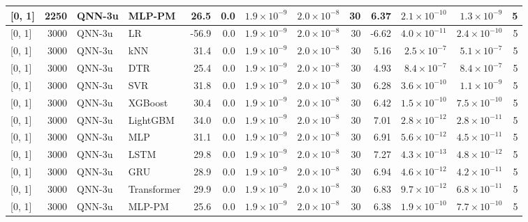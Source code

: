\begin{longtable}{lrllrrrrrrrrr}
{[0, 1]} & 2250 & QNN-3u & MLP-PM & 26.5 & 0.0 & $1.9 \times 10^{-9}$ & $2.0 \times 10^{-8}$ & 30 & 6.37 & $2.1 \times 10^{-10}$ & $1.3 \times 10^{-9}$ & 5 \\
\midrule
{[0, 1]} & 3000 & QNN-3u & LR & -56.9 & 0.0 & $1.9 \times 10^{-9}$ & $2.0 \times 10^{-8}$ & 30 & -6.62 & $4.0 \times 10^{-11}$ & $2.4 \times 10^{-10}$ & 5 \\
{[0, 1]} & 3000 & QNN-3u & kNN & 31.4 & 0.0 & $1.9 \times 10^{-9}$ & $2.0 \times 10^{-8}$ & 30 & 5.16 & $2.5 \times 10^{-7}$ & $5.1 \times 10^{-7}$ & 5 \\
{[0, 1]} & 3000 & QNN-3u & DTR & 25.4 & 0.0 & $1.9 \times 10^{-9}$ & $2.0 \times 10^{-8}$ & 30 & 4.93 & $8.4 \times 10^{-7}$ & $8.4 \times 10^{-7}$ & 5 \\
{[0, 1]} & 3000 & QNN-3u & SVR & 31.8 & 0.0 & $1.9 \times 10^{-9}$ & $2.0 \times 10^{-8}$ & 30 & 6.28 & $3.6 \times 10^{-10}$ & $1.1 \times 10^{-9}$ & 5 \\
{[0, 1]} & 3000 & QNN-3u & XGBoost & 30.4 & 0.0 & $1.9 \times 10^{-9}$ & $2.0 \times 10^{-8}$ & 30 & 6.42 & $1.5 \times 10^{-10}$ & $7.5 \times 10^{-10}$ & 5 \\
{[0, 1]} & 3000 & QNN-3u & LightGBM & 34.0 & 0.0 & $1.9 \times 10^{-9}$ & $2.0 \times 10^{-8}$ & 30 & 7.01 & $2.8 \times 10^{-12}$ & $2.8 \times 10^{-11}$ & 5 \\
{[0, 1]} & 3000 & QNN-3u & MLP & 31.1 & 0.0 & $1.9 \times 10^{-9}$ & $2.0 \times 10^{-8}$ & 30 & 6.91 & $5.6 \times 10^{-12}$ & $4.5 \times 10^{-11}$ & 5 \\
{[0, 1]} & 3000 & QNN-3u & LSTM & 29.8 & 0.0 & $1.9 \times 10^{-9}$ & $2.0 \times 10^{-8}$ & 30 & 7.27 & $4.3 \times 10^{-13}$ & $4.8 \times 10^{-12}$ & 5 \\
{[0, 1]} & 3000 & QNN-3u & GRU & 28.9 & 0.0 & $1.9 \times 10^{-9}$ & $2.0 \times 10^{-8}$ & 30 & 6.94 & $4.6 \times 10^{-12}$ & $4.2 \times 10^{-11}$ & 5 \\
{[0, 1]} & 3000 & QNN-3u & Transformer & 29.9 & 0.0 & $1.9 \times 10^{-9}$ & $2.0 \times 10^{-8}$ & 30 & 6.83 & $9.7 \times 10^{-12}$ & $6.8 \times 10^{-11}$ & 5 \\
{[0, 1]} & 3000 & QNN-3u & MLP-PM & 25.6 & 0.0 & $1.9 \times 10^{-9}$ & $2.0 \times 10^{-8}$ & 30 & 6.38 & $1.9 \times 10^{-10}$ & $7.7 \times 10^{-10}$ & 5 \\
\end{longtable}
\par{}
